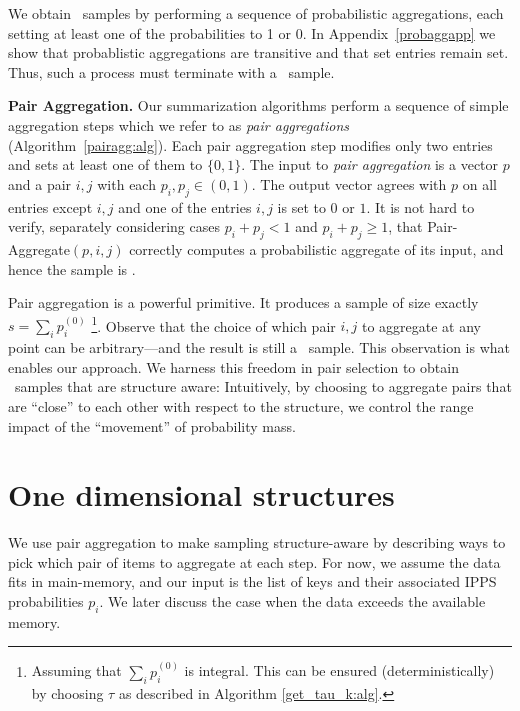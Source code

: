 \documentclass[11pt]{article}
\begin{document}
We obtain \varopt\ samples by performing a sequence of
probabilistic aggregations, each setting
at least one of the probabilities to 1 or 0. 
In Appendix~\ref{probaggapp} we show that probablistic aggregations
are transitive and that set entries remain set.  Thus, such a process
must terminate with a \varopt\ sample. 





\smallskip
\noindent
{\bf Pair Aggregation.}
Our summarization algorithms perform
a sequence of simple aggregation steps which we refer to as
{\em pair aggregations} (Algorithm~\ref{pairagg:alg}).
Each pair aggregation step modifies only two entries 
and sets at least one of them to $\{0,1\}$.  
The input to {\em pair aggregation} is a
vector $p$ and a pair $i,j$ with each $p_i,p_j\in (0,1)$.  The output
vector agrees with $p$ on all entries except $i,j$ and one of the
entries $i,j$ is set to $0$ or $1$.  It is not hard to verify, separately considering cases $p_i+p_j<1$ and $p_i+p_j\geq 1$,
that {\sc Pair-Aggregate}$(p,i,j)$ correctly computes 
a probabilistic aggregate of its input, and hence the sample is \varopt.


Pair aggregation is a powerful primitive.
It produces a sample of size exactly $s=\sum_i p^{(0)}_i$ 
\footnote{Assuming that 
 $\sum_i p^{(0)}_i$ is integral.  
This can be ensured (deterministically) by choosing $\tau$ as
described in Algorithm \ref{get_tau_k:alg}.}.
Observe that the choice of which pair $i,j$ to aggregate at any point
can be arbitrary---and the result is still a \varopt\ sample.  
This observation is what enables our approach.   
We harness this freedom in pair selection
to obtain \varopt\ samples that are structure
aware:  
Intuitively, by choosing to aggregate pairs that are
 ``close'' to each other with respect to the structure, 
we control the range impact of the ``movement'' of probability mass.

\section{One dimensional structures} \label{onedim:sec}

We use pair aggregation to make sampling structure-aware by describing
ways to pick which pair of items to aggregate at each step. 
For now, we assume  the data fits in main-memory, 
and our input is the list of keys and their associated IPPS
probabilities $p_i$.
We later
discuss the case when the data exceeds the available memory.
\end{document}
